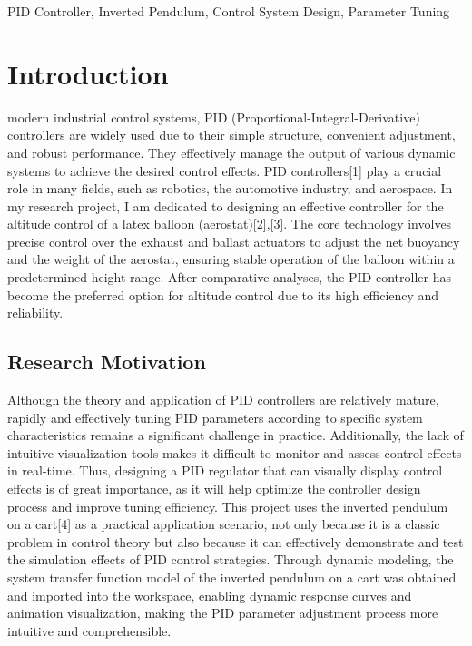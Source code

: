 \documentclass[journal,twoside,web]{ieeecolor}
\begin{document}
\begin{IEEEkeywords}
PID Controller, Inverted Pendulum, Control System Design, Parameter Tuning
\end{IEEEkeywords}

\section{Introduction}
\label{sec:introduction}
 modern industrial control systems, PID (Proportional-Integral-Derivative) controllers are widely used due to their simple structure, convenient adjustment, and robust performance. They effectively manage the output of various dynamic systems to achieve the desired control effects. PID controllers[1] play a crucial role in many fields, such as robotics, the automotive industry, and aerospace. In my research project, I am dedicated to designing an effective controller for the altitude control of a latex balloon (aerostat)[2],[3]. The core technology involves precise control over the exhaust and ballast actuators to adjust the net buoyancy and the weight of the aerostat, ensuring stable operation of the balloon within a predetermined height range. After comparative analyses, the PID controller has become the preferred option for altitude control due to its high efficiency and reliability.

\subsection{Research Motivation}
Although the theory and application of PID controllers are relatively mature, rapidly and effectively tuning PID parameters according to specific system characteristics remains a significant challenge in practice. Additionally, the lack of intuitive visualization tools makes it difficult to monitor and assess control effects in real-time. Thus, designing a PID regulator that can visually display control effects is of great importance, as it will help optimize the controller design process and improve tuning efficiency. This project uses the inverted pendulum on a cart[4] as a practical application scenario, not only because it is a classic problem in control theory but also because it can effectively demonstrate and test the simulation effects of PID control strategies. Through dynamic modeling, the system transfer function model of the inverted pendulum on a cart was obtained and imported into the workspace, enabling dynamic response curves and animation visualization, making the PID parameter adjustment process more intuitive and comprehensible.
\end{document}
